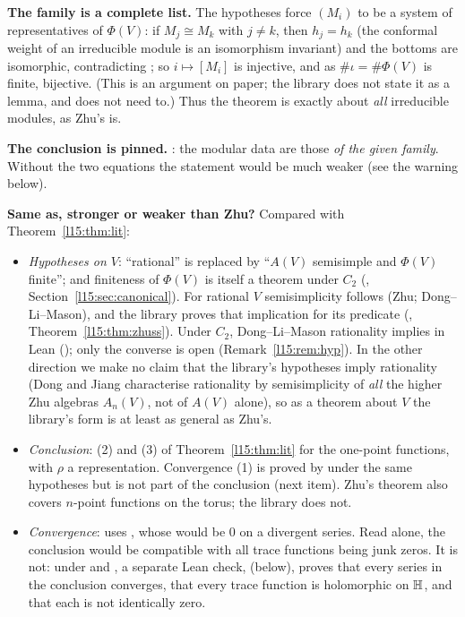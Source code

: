 \begin{dictionary}
\textbf{The family is a complete list.} The hypotheses force $(M_i)$ to be a system of representatives of $\Phi(V)$: if
$M_j\cong M_k$ with $j\neq k$, then $h_j=h_k$ (the conformal weight of an irreducible module is an isomorphism invariant) and
the bottoms are isomorphic, contradicting ; so $i\mapsto[M_i]$ is injective, and as $\#\iota=\#\Phi(V)$ is finite,
bijective. (This is an argument on paper; the library does not state it as a lemma, and does not need to.) Thus the
theorem is exactly about \emph{all} irreducible modules, as Zhu's is.

\textbf{The conclusion is pinned.} : the
modular data are those \emph{of the given family}. Without the two equations the statement would be much weaker (see the
warning below).

\textbf{Same as, stronger or weaker than Zhu?} Compared with Theorem~\ref{l15:thm:lit}:
\begin{itemize}
\item \emph{Hypotheses on $V$}: ``rational'' is replaced by ``$A(V)$ semisimple and $\Phi(V)$ finite''; and finiteness of
  $\Phi(V)$ is itself a theorem under $C_2$ (, Section~\ref{l15:sec:canonical}). For
  rational $V$ semisimplicity follows (Zhu; Dong--Li--Mason), and the library proves that implication for its predicate
   (\allowbreak{}\allowbreak{}, Theorem~\ref{l15:thm:zhuss}). Under $C_2$,
  Dong--Li--Mason rationality implies  in Lean (); only the
  converse is open (Remark~\ref{l15:rem:hyp}). In the
  other direction we make no claim that the library's hypotheses imply rationality (Dong and Jiang characterise
  rationality by semisimplicity of \emph{all} the higher Zhu algebras $A_n(V)$, not of $A(V)$ alone), so as a theorem
  about $V$ the library's form is at least as general as Zhu's.
\item \emph{Conclusion}: (2) and (3) of Theorem~\ref{l15:thm:lit} for the one-point functions, with $\rho$ a representation.
  Convergence (1) is proved by  under the same hypotheses but is not part of the conclusion
  (next item). Zhu's theorem also covers $n$-point functions on the torus; the library does not.
\item \emph{Convergence}:  uses , whose  would be $0$ on a divergent
  series. Read alone, the conclusion would be compatible with all trace functions being junk zeros. It is not: under
   and , a separate Lean check, \allowbreak{} (below), proves that every series in the
  conclusion converges, that every trace function is holomorphic on $\mathbb{H}$, and that each is not identically zero.
\end{itemize}


\end{dictionary}
